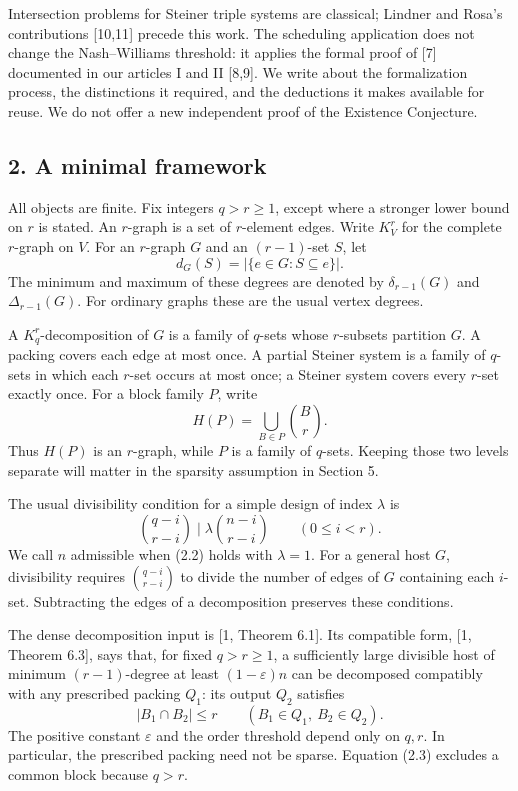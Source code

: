\documentclass[english,11pt,a4paper]{article}
\begin{document}
Intersection problems for Steiner triple systems are classical; Lindner and Rosa's contributions {[}10,11{]} precede this work. The scheduling application does not change the Nash--Williams threshold: it applies the formal proof of {[}7{]} documented in our articles I and II {[}8,9{]}. We write about the formalization process, the distinctions it required, and the deductions it makes available for reuse. We do not offer a new independent proof of the Existence Conjecture.

\subsection{2. A minimal framework}\label{a-minimal-framework}

All objects are finite. Fix integers \(q>r\ge1\), except where a stronger lower bound on \(r\) is stated. An \(r\)-graph is a set of \(r\)-element edges. Write \(K_V^r\) for the complete \(r\)-graph on \(V\). For an \(r\)-graph \(G\) and an \((r-1)\)-set \(S\), let \[d_G(S)=|\{e\in G:S\subseteq e\}|.\] The minimum and maximum of these degrees are denoted by \(\delta_{r-1}(G)\) and \(\Delta_{r-1}(G)\). For ordinary graphs these are the usual vertex degrees.

A \(K_q^r\)-decomposition of \(G\) is a family of \(q\)-sets whose \(r\)-subsets partition \(G\). A packing covers each edge at most once. A partial Steiner system is a family of \(q\)-sets in which each \(r\)-set occurs at most once; a Steiner system covers every \(r\)-set exactly once. For a block family \(P\), write \[H(P)=\bigcup_{B\in P}\binom{B}{r}.
\tag{2.1}\] Thus \(H(P)\) is an \(r\)-graph, while \(P\) is a family of \(q\)-sets. Keeping those two levels separate will matter in the sparsity assumption in Section 5.

The usual divisibility condition for a simple design of index \(\lambda\) is \[\binom{q-i}{r-i}\mid\lambda\binom{n-i}{r-i}
\qquad(0\le i<r).
\tag{2.2}\] We call \(n\) admissible when (2.2) holds with \(\lambda=1\). For a general host \(G\), divisibility requires \(\binom{q-i}{r-i}\) to divide the number of edges of \(G\) containing each \(i\)-set. Subtracting the edges of a decomposition preserves these conditions.

The dense decomposition input is {[}1, Theorem 6.1{]}. Its compatible form, {[}1, Theorem 6.3{]}, says that, for fixed \(q>r\ge1\), a sufficiently large divisible host of minimum \((r-1)\)-degree at least \((1-\varepsilon)n\) can be decomposed compatibly with any prescribed packing \(Q_1\): its output \(Q_2\) satisfies \[|B_1\cap B_2|\le r
\qquad(B_1\in Q_1,\ B_2\in Q_2).
\tag{2.3}\] The positive constant \(\varepsilon\) and the order threshold depend only on \(q,r\). In particular, the prescribed packing need not be sparse. Equation (2.3) excludes a common block because \(q>r\).
\end{document}
